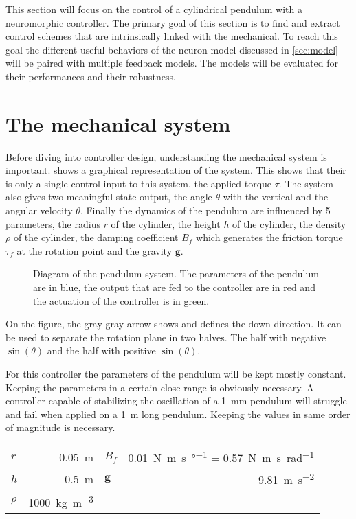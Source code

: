 \label{sec:pendulum}
This section will focus on the control of a cylindrical pendulum with a neuromorphic controller.
The primary goal of this section is to find and extract control schemes that are intrinsically linked with the mechanical.
To reach this goal the different useful behaviors of the neuron model discussed in \cref{sec:model} will be paired with multiple feedback models. The models will be evaluated for their performances and their robustness.

\section{The mechanical system}

Before diving into controller design, understanding the mechanical system is important.  shows a graphical representation of the system. This shows that their is only a single control input to this system, the applied torque $\tau$. The system also gives two meaningful state output, the angle $\theta$ with the vertical and the angular velocity $\dot{\theta}$. Finally the dynamics of the pendulum are influenced by 5 parameters, the radius $r$ of the cylinder, the height $h$ of the cylinder, the density $\rho$ of the cylinder, the damping coefficient $B_f$ which generates the friction torque $\tau_f$ at the rotation point and the gravity $\mathbf{g}$. 
\begin{figure}[!htb]
    \centering
    \caption{Diagram of the pendulum system. The parameters of the pendulum are in blue, the output that are fed to the controller are in red and the actuation of the controller is in green.}
    \label{fig:pendulum}
\end{figure}

On the figure, the gray gray arrow shows and defines the down direction. It can be used to separate the rotation plane in two halves. The half with negative $\sin\left(\theta\right)$ and the half with positive $\sin\left(\theta\right)$.

For this controller the parameters of the pendulum will be kept mostly constant. Keeping the parameters in a certain close range is obviously necessary. A controller capable of stabilizing the oscillation of a \qty{1}{\milli\meter} pendulum will struggle and fail when applied on a \qty{1}{\meter} long pendulum. Keeping the values in same order of magnitude is necessary.

{

\large\centering
\begin{tabular}{lr|lr}
    $r$     & \qty{0.05}{\meter}                  & $B_f$    & \qty{0.01}{\newton\meter\second\per\degree} = \qty{0.57}{\newton\meter\second\per\radian}\\
    $h$     & \qty{0.5}{\meter}                   & $\mathbf{g}$    & \qty{9.81}{\meter\per\second\squared}\\
    $\rho$  & \qty{1000}{\kg\per\cubic\meter}     &               & \\
\end{tabular}

}

